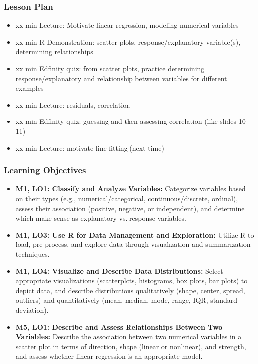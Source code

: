 \begin{frame}
    \frametitle{Lesson Plan}
    \begin{itemize}
        \item xx min Lecture: Motivate linear regression, modeling numerical variables
        \item xx min R Demonstration: scatter plots, response/explanatory variable(s), determining relationships
        \item xx min Edfinity quiz: from scatter plots, practice determining response/explanatory and relationship between variables for different examples
        \item xx min Lecture: residuals, correlation
        \item xx min Edfinity quiz: guessing and then assessing correlation (like slides 10-11)
        \item xx min Lecture: motivate line-fitting (next time)
    \end{itemize}
\end{frame}

\begin{frame}
    \frametitle{Learning Objectives}
    \begin{itemize}
        \item \textbf{M1, LO1: Classify and Analyze Variables:} Categorize variables based on their types (e.g., numerical/categorical, continuous/discrete, ordinal), assess their association (positive, negative, or independent), and determine which make sense as explanatory vs. response variables.
        \item \textbf{M1, LO3: Use R for Data Management and Exploration:} Utilize R to load, pre-process, and explore data through visualization and summarization techniques.
        \item \textbf{M1, LO4: Visualize and Describe Data Distributions:} Select appropriate visualizations (scatterplots, histograms, box plots, bar plots) to depict data, and describe distributions qualitatively (shape, center, spread, outliers) and quantitatively (mean, median, mode, range, IQR, standard deviation).
        \item \textbf{M5, LO1: Describe and Assess Relationships Between Two Variables:} Describe the association between two numerical variables in a scatter plot in terms of direction, shape (linear or nonlinear), and strength, and assess whether linear regression is an appropriate model.    
    \end{itemize}
\end{frame}
    
